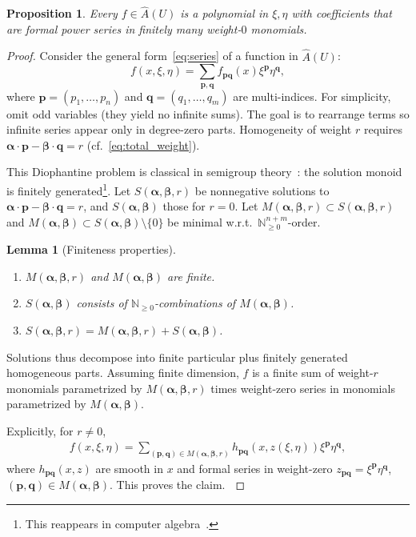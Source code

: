 \documentclass[a4paper,12pt]{amsart}
\newtheorem{proposition}{Proposition}
\newtheorem{lemma}{Lemma}
\newcommand{\beq}{\begin{eqnarray}}
\newcommand{\eeq}{\end{eqnarray}}
\newcommand{\N}{{\mathbb N}}
\begin{document}
\begin{proposition}\label{prop:graded-series}\normalfont
Every $f\in\hat{A}(U)$ is a polynomial in ${\xi},{\eta}$ with coefficients that are formal power series in finitely many weight-$0$ monomials.
\end{proposition}

\noindent\begin{proof}
Consider the general form~\eqref{eq:series} of a function in $\hat{A} (U)$:
\begin{equation}\label{eq:series}
f (x, {\xi}, {\eta})= \sum_{\bm{p},\bm{q}} f_{\bm{p}\bm{q}}(x) {\xi}^{\bm{p}} {\eta}^{\bm{q}},
\end{equation}
where $\bm{p}=(p_1,\ldots,p_n)$ and $\bm{q}=(q_1,\ldots,q_m)$ are multi-indices. For simplicity, omit odd variables (they yield no infinite sums). The goal is to rearrange terms so infinite series appear only in degree-zero parts. Homogeneity of weight $r$ requires $\bm{\alpha}\cdot\bm{p}-\bm{\beta}\cdot\bm{q}=r$ (cf.~\eqref{eq:total_weight}).

\smallskip\noindent
This Diophantine problem is classical in semigroup theory~\cite{clifford1,clifford2}: the solution monoid is finitely generated\footnote{This reappears in computer algebra~\cite{clausen}.}. Let $S(\bm{\alpha},\bm{\beta},r)$ be nonnegative solutions to $\bm{\alpha}\cdot\bm{p}-\bm{\beta}\cdot\bm{q}=r$, and $S(\bm{\alpha},\bm{\beta})$ those for $r=0$. Let $M(\bm{\alpha},\bm{\beta},r)\subset S(\bm{\alpha},\bm{\beta},r)$ and $M(\bm{\alpha},\bm{\beta})\subset S(\bm{\alpha},\bm{\beta})\setminus\{0\}$ be minimal w.r.t.~$\N_{\ge0}^{n+m}$-order.

\begin{lemma}[Finiteness properties]\label{lem:finiteness}{\mbox{}\vskip 2mm}
\begin{enumerate}
\item $M(\bm{\alpha},\bm{\beta},r)$ and $M(\bm{\alpha},\bm{\beta})$ are finite.
\item $S(\bm{\alpha},\bm{\beta})$ consists of $\N_{\ge 0}$-combinations of $M(\bm{\alpha},\bm{\beta})$.
\item $S(\bm{\alpha},\bm{\beta},r)=M(\bm{\alpha},\bm{\beta},r)+S(\bm{\alpha},\bm{\beta})$.
\end{enumerate}
\end{lemma}

\noindent Solutions thus decompose into finite particular plus finitely generated homogeneous parts. Assuming finite dimension, $f$ is a finite sum of weight-$r$ monomials parametrized by $M(\bm{\alpha},\bm{\beta},r)$ times weight-zero series in monomials parametrized by $M(\bm{\alpha},\bm{\beta})$.

\smallskip\noindent Explicitly, for $r\ne 0$,
\beq\label{eq:f-series}
f(x,{\xi},{\eta})=\sum_{(\bm{p},\bm{q})\in M(\bm{\alpha},\bm{\beta},r)} h_{\bm{p}\bm{q}}(x,z({\xi},{\eta})) {\xi}^{\bm{p}} {\eta}^{\bm{q}},
\eeq
where $h_{\bm{p}\bm{q}}(x,z)$ are smooth in $x$ and formal series in weight-zero $z_{\bm{p}\bm{q}}={\xi}^{\bm{p}}{\eta}^{\bm{q}}$, $(\bm{p},\bm{q})\in M(\bm{\alpha},\bm{\beta})$. This proves the claim. $\qedhere$
\end{proof}
\end{document}
